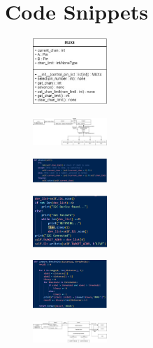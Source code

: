 \documentclass [12pt]{article}
\begin{document}
\section{Code Snippets}\label{app:code_snippets}
\begin{figure}[h]
    \centering
    \includegraphics[width=0.25\textwidth]{MUX_4.png}
    \caption{}
    \label{fig:MUX_diag}
\end{figure}
\begin{figure}[h]
    \centering
    \includegraphics[width=0.25\textwidth]{S_S_controller.jpg}
    \caption{}
    \label{fig:SS_cont}
\end{figure}
\begin{figure}[h]
    \centering
    \includegraphics[width=0.25\textwidth]{try_loop.png}
    \caption{}
    \label{fig:try_loop}
\end{figure}
\begin{figure}[h]
    \centering
    \includegraphics[width=0.25\textwidth]{i2c_init.png}
    \caption{}
    \label{fig:i2c_init}
\end{figure}
\begin{figure}[h]
    \centering
    \includegraphics[width=0.25\textwidth]{trans_code.png}
    \caption{}
    \label{fig:trans_code}
\end{figure}
\begin{figure}[h]
    \centering
    \includegraphics[width=0.25\textwidth]{S_S_interface.jpg}
    \caption{}
    \label{fig:SS_interface}
\end{figure}
\end{document}
